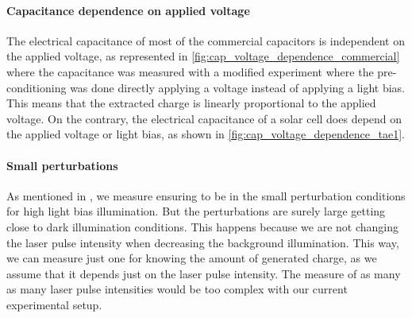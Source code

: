	\paragraph{Capacitance dependence on applied voltage}
	The electrical capacitance of most of the commercial capacitors is independent on the applied voltage, as represented in \cref{fig:cap_voltage_dependence_commercial} where the capacitance was measured with a modified  experiment where the pre\hyp{}conditioning was done directly applying a voltage instead of applying a light bias.
	This means that the extracted charge is linearly proportional to the applied voltage.
	On the contrary, the electrical capacitance of a solar cell does depend on the applied voltage or light bias, as shown in \cref{fig:cap_voltage_dependence_tae1}.
	\begin{figure}%
	\end{figure}

	\paragraph{Small perturbations}\label{dc_perturbation}
	As mentioned in , we measure  ensuring to be in the small perturbation conditions for high light bias illumination.
	But the perturbations are surely large getting close to dark illumination conditions.
	This happens because we are not changing the laser pulse intensity when decreasing the background illumination.
	This way, we can measure just one  for knowing the amount of generated charge, as we assume that it depends just on the laser pulse intensity.
	The measure of as many  as many laser pulse intensities would be too complex with our current experimental setup.

